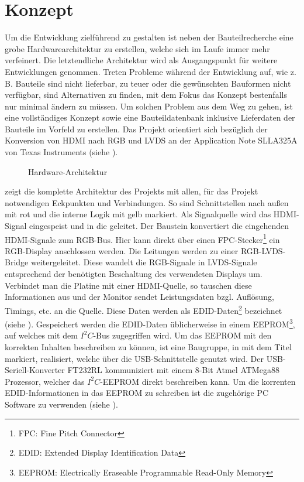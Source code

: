 \section{Konzept}
\label{sec:TeilB_Konzept}
Um die Entwicklung zielführend zu gestalten ist neben der Bauteilrecherche eine grobe Hardwarearchitektur zu erstellen, welche sich im Laufe immer mehr verfeinert. Die letztendliche Architektur wird als Ausgangspunkt für weitere Entwicklungen genommen. Treten Probleme während der Entwicklung auf, wie z. B. Bauteile sind nicht lieferbar, zu teuer oder die gewünschten Bauformen nicht verfügbar, sind Alternativen zu finden, mit dem Fokus das Konzept bestenfalls nur minimal ändern zu müssen. Um solchen Problem aus dem Weg zu gehen, ist eine vollständiges Konzept sowie eine Bauteildatenbank inklusive Lieferdaten der Bauteile im Vorfeld zu erstellen. Das Projekt orientiert sich bezüglich der Konversion von HDMI nach RGB und LVDS an der Application Note SLLA325A von Texas Instruments (siehe \cite{TI2011}).
\begin{figure}[htp]
	\centering
{}
	\caption{Hardware-Architektur}
	\label{fig:teilb_architektur}
\end{figure}

 zeigt die komplette Architektur des Projekts mit allen, für das Projekt notwendigen Eckpunkten und Verbindungen. So sind Schnittstellen nach außen mit rot und die interne Logik mit gelb markiert. Als Signalquelle wird das HDMI-Signal eingespeist und in die  geleitet. Der Baustein  konvertiert die eingehenden HDMI-Signale zum RGB-Bus. Hier kann direkt über einen FPC-Stecker\footnote{FPC: Fine Pitch Connector} ein RGB-Display anschlossen werden. Die Leitungen werden zu einer RGB-LVDS-Bridge weitergeleitet. Diese wandelt die RGB-Signale in LVDS-Signale entsprechend der benötigten Beschaltung des verwendeten Displays um. Verbindet man die Platine mit einer HDMI-Quelle, so tauschen diese Informationen aus und der Monitor sendet Leistungsdaten bzgl. Auflösung, Timings, etc. an die Quelle. Diese Daten werden als EDID-Daten\footnote{EDID: Extended Display Identification Data} bezeichnet (siehe \cite{edid2000}). Gespeichert werden die EDID-Daten üblicherweise in einem EEPROM\footnote{EEPROM: Electrically Eraseable Programmable Read-Only Memory}, auf welches mit dem $I^2C$-Bus zugegriffen wird. Um das EEPROM mit den korrekten Inhalten beschreiben zu können, ist eine Baugruppe, in  mit dem Titel  markiert, realisiert, welche über die USB-Schnittstelle genutzt wird. Der USB-Seriell-Konverter FT232RL kommuniziert mit einem 8-Bit Atmel ATMega88 Prozessor, welcher das $I^2C$-EEPROM direkt beschreiben kann. Um die korrenten EDID-Informationen in das EEPROM zu schreiben ist die zugehörige PC Software zu verwenden (siehe ).\newpage